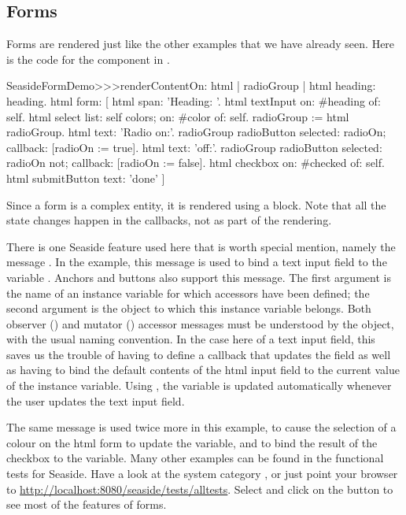 \documentclass[a4paper,10pt,twoside]{book}
\begin{document}

\subsection{Forms}

Forms are rendered just like the other examples that we have already seen.
Here is the code for the  component in .

\begin{code}{}
SeasideFormDemo>>>renderContentOn: html
	| radioGroup |
	html heading: heading.
	html form: [
		html span: 'Heading: '.
		html textInput on: #heading of: self.
		html select
			list: self colors;
			on: #color of: self.
		radioGroup := html radioGroup.
		html text: 'Radio on:'.
		radioGroup radioButton
			selected: radioOn;
			callback: [radioOn := true].
		html text: 'off:'.
		radioGroup radioButton
			selected: radioOn not;
			callback: [radioOn := false].
		html checkbox on: #checked of: self.
		html submitButton
			text: 'done' ]
\end{code}{}

Since a form is a complex entity, it is rendered using a block.
Note that all the state changes happen in the callbacks, not as part of the rendering.

There is one Seaside feature used here that is worth special mention, namely the message .
In the example, this message is used to bind a text input field to the variable .
Anchors and buttons also support this message.
The first argument is the name of an instance variable for which accessors have been defined;  the second argument is the object to which this instance variable belongs.
Both observer () and mutator () accessor messages must be understood by the object, with the usual naming convention.
In the case here of a text input field, this saves us the trouble of having to define a callback that updates the field as well as having to bind the default contents of the html input field to the current value of the instance variable.
Using , the  variable is updated automatically whenever the user updates the text input field.

The same message is used twice more in this example, to cause the selection of a colour on the html form to update the  variable, and to bind the result of the checkbox to the  variable.
Many other examples can be found in the functional tests for Seaside.
Have a look at the system category , or just point your browser to \url{http://localhost:8080/seaside/tests/alltests}.
Select  and click on the  button to see most of the features of forms.
\end{document}
